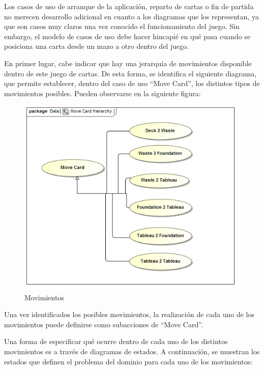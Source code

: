 \documentclass[11pt]{article}
\begin{document}
Los casos de uso de arranque de la aplicación, reparto de cartas o fin de partida no merecen desarrollo adicional en cuanto a los diagramas que los representan, ya que son casos muy claros una vez conocido el funcionamiento del juego. Sin embargo, el modelo de casos de uso debe hacer hincapié en qué pasa cuando se posiciona una carta desde un mazo a otro dentro del juego.

En primer lugar, cabe indicar que hay una jerarquía de movimientos disponible dentro de este juego de cartas. De esta forma, se identifica el siguiente diagrama, que permite establecer, dentro del caso de uso ``Move Card'', los distintos tipos de movimientos posibles. Pueden observarse en la siguiente figura:

\begin{center}
 \begin{figure}[H]
 \begin{center}
   \includegraphics[width=15cm]{DomainModel/MoveCardHierarchy.jpg}
   \caption{Movimientos}
   \label{fig:movements}
 \end{center}
 \end{figure}
\end{center}

Una vez identificados los posibles movimientos, la realización de cada uno de los movimientos puede definirse como subacciones de ``Move Card''.

Una forma de especificar qué ocurre dentro de cada uno de los distintos movimientos es a través de diagramas de estados. A continuación, se muestran los estados que definen el problema del dominio para cada uno de los movimientos:
\end{document}
